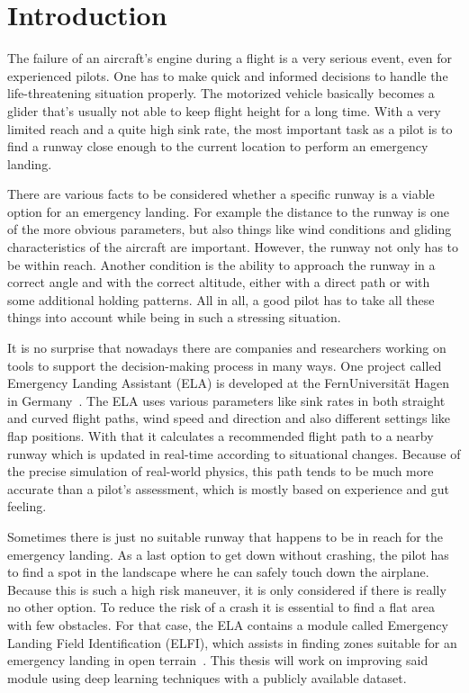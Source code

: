 \section{Introduction}
The failure of an aircraft's engine during a flight is a very serious event, even for experienced pilots. One has to make quick and informed decisions to handle the life-threatening situation properly. The motorized vehicle basically becomes a glider that's usually not able to keep flight height for a long time. With a very limited reach and a quite high sink rate, the most important task as a pilot is to find a runway close enough to the current location to perform an emergency landing.

There are various facts to be considered whether a specific runway is a viable option for an emergency landing. For example the distance to the runway is one of the more obvious parameters, but also things like wind conditions and gliding characteristics of the aircraft are important. However, the runway not only has to be within reach. Another condition is the ability to approach the runway in a correct angle and with the correct altitude, either with a direct path or with some additional holding patterns. All in all, a good pilot has to take all these things into account while being in such a stressing situation.

It is no surprise that nowadays there are companies and researchers working on tools to support the decision-making process in many ways. One project called Emergency Landing Assistant (ELA) is developed at the FernUniversität Hagen in Germany~\cite{feu_fas}. The ELA uses various parameters like sink rates in both straight and curved flight paths, wind speed and direction and also different settings like flap positions. With that it calculates a recommended flight path to a nearby runway which is updated in real-time according to situational changes. Because of the precise simulation of real-world physics, this path tends to be much more accurate than a pilot's assessment, which is mostly based on experience and gut feeling.

Sometimes there is just no suitable runway that happens to be in reach for the emergency landing. As a last option to get down without crashing, the pilot has to find a spot in the landscape where he can safely touch down the airplane. Because this is such a high risk maneuver, it is only considered if there is really no other option. To reduce the risk of a crash it is essential to find a flat area with few obstacles. For that case, the ELA contains a module called Emergency Landing Field Identification (ELFI), which assists in finding zones suitable for an emergency landing in open terrain~\cite{feu_elfi}. This thesis will work on improving said module using deep learning techniques with a publicly available dataset.

